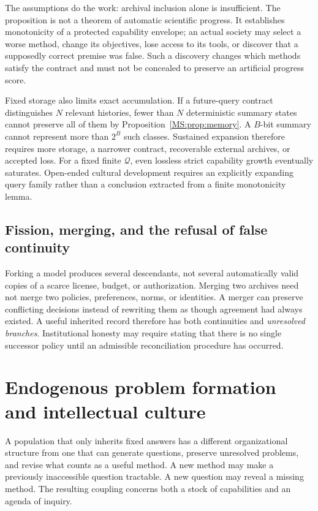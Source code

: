 The assumptions do the work: archival inclusion alone is insufficient. The proposition is not a theorem of automatic scientific progress. It establishes monotonicity of a protected capability envelope; an actual society may select a worse method, change its objectives, lose access to its tools, or discover that a supposedly correct premise was false. Such a discovery changes which methods satisfy the contract and must not be concealed to preserve an artificial progress score.

Fixed storage also limits exact accumulation. If a future-query contract distinguishes $N$ relevant histories, fewer than $N$ deterministic summary states cannot preserve all of them by Proposition~\ref{MS:prop:memory}. A $B$-bit summary cannot represent more than $2^B$ such classes. Sustained expansion therefore requires more storage, a narrower contract, recoverable external archives, or accepted loss. For a fixed finite $\mathcal Q$, even lossless strict capability growth eventually saturates. Open-ended cultural development requires an explicitly expanding query family rather than a conclusion extracted from a finite monotonicity lemma.

\subsection{Fission, merging, and the refusal of false continuity}

Forking a model produces several descendants, not several automatically valid copies of a scarce license, budget, or authorization. Merging two archives need not merge two policies, preferences, norms, or identities. A merger can preserve conflicting decisions instead of rewriting them as though agreement had always existed. A useful inherited record therefore has both continuities and \emph{unresolved branches}. Institutional honesty may require stating that there is no single successor policy until an admissible reconciliation procedure has occurred.


\section{Endogenous problem formation and intellectual culture}\label{MS:sec:agendas}
A population that only inherits fixed answers has a different organizational structure from one that can generate questions, preserve unresolved problems, and revise what counts as a useful method. A new method may make a previously inaccessible question tractable. A new question may reveal a missing method. The resulting coupling concerns both a stock of capabilities and an agenda of inquiry.

